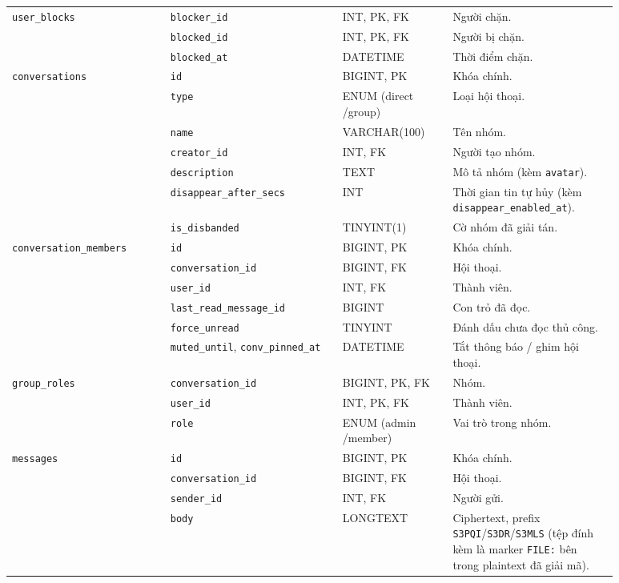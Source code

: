 {\begin{longtable}{|p{0.23\linewidth}|p{0.25\linewidth}|p{0.16\linewidth}|p{0.24\linewidth}|}
\texttt{user\_blocks} & \texttt{blocker\_id} & INT, PK, FK & Người chặn. \\ \cline{2-4}
 & \texttt{blocked\_id} & INT, PK, FK & Người bị chặn. \\ \cline{2-4}
 & \texttt{blocked\_at} & DATETIME & Thời điểm chặn. \\ \hline
\texttt{conversations} & \texttt{id} & BIGINT, PK & Khóa chính. \\ \cline{2-4}
 & \texttt{type} & ENUM (direct /group) & Loại hội thoại. \\ \cline{2-4}
 & \texttt{name} & VARCHAR(100) & Tên nhóm. \\ \cline{2-4}
 & \texttt{creator\_id} & INT, FK & Người tạo nhóm. \\ \cline{2-4}
 & \texttt{description} & TEXT & Mô tả nhóm (kèm \texttt{avatar}). \\ \cline{2-4}
 & \texttt{disappear\_after\_secs} & INT & Thời gian tin tự hủy (kèm \texttt{disappear\_enabled\_at}). \\ \cline{2-4}
 & \texttt{is\_disbanded} & TINYINT(1) & Cờ nhóm đã giải tán. \\ \hline
\texttt{conversation\_members} & \texttt{id} & BIGINT, PK & Khóa chính. \\ \cline{2-4}
 & \texttt{conversation\_id} & BIGINT, FK & Hội thoại. \\ \cline{2-4}
 & \texttt{user\_id} & INT, FK & Thành viên. \\ \cline{2-4}
 & \texttt{last\_read\_message\_id} & BIGINT & Con trỏ đã đọc. \\ \cline{2-4}
 & \texttt{force\_unread} & TINYINT & Đánh dấu chưa đọc thủ công. \\ \cline{2-4}
 & \texttt{muted\_until}, \texttt{conv\_pinned\_at} & DATETIME & Tắt thông báo / ghim hội thoại. \\ \hline
\texttt{group\_roles} & \texttt{conversation\_id} & BIGINT, PK, FK & Nhóm. \\ \cline{2-4}
 & \texttt{user\_id} & INT, PK, FK & Thành viên. \\ \cline{2-4}
 & \texttt{role} & ENUM (admin /member) & Vai trò trong nhóm. \\ \hline
\texttt{messages} & \texttt{id} & BIGINT, PK & Khóa chính. \\ \cline{2-4}
 & \texttt{conversation\_id} & BIGINT, FK & Hội thoại. \\ \cline{2-4}
 & \texttt{sender\_id} & INT, FK & Người gửi. \\ \cline{2-4}
 & \texttt{body} & LONGTEXT & Ciphertext, prefix \texttt{S3PQI}/\texttt{S3DR}/\texttt{S3MLS} (tệp đính kèm là marker \texttt{FILE:} bên trong plaintext đã giải mã). \\ \cline{2-4}

\end{longtable}}
